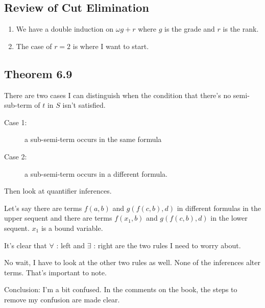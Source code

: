 \documentclass{article}
\begin{document}
\subsection{Review of Cut Elimination}
\begin{enumerate}
\item We have a double induction on \(\omega g + r\) where \(g\) is the grade and \(r\) is the rank.
\item The case of \(r = 2\) is where I want to start.
\end{enumerate}

\subsection{Theorem 6.9}
There are two cases I can distinguish when the condition that there's no semi-sub-term of \(t\) in \(S\)
isn't satisfied.
\begin{description}
\item[Case 1:] a sub-semi-term occurs in the same formula
\item[Case 2:] a sub-semi-term occurs in a different formula.
\end{description}
Then look at quantifier inferences.

Let's say there are terms \(f(a, b)\) and \(g(f(c, b), d)\) in different formulas in the upper sequent and
there are terms \(f(x_1, b)\) and \(g(f(c, b), d)\) in the lower sequent. \(x_1\) is a bound variable.

It's clear that \(\forall\) : left and \(\exists\) : right are the two rules I need to worry about.

No wait, I have to look at the other two rules as well. None of the inferences alter terms. That's
important to note.

Conclusion: I'm a bit confused. In the comments on the book, the steps to remove my confusion
are made clear.
\end{document}
